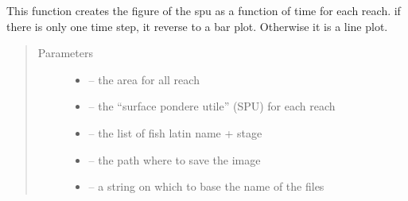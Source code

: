 \documentclass[letterpaper,10pt,english]{sphinxmanual}
\begin{document}
\begin{fulllineitems}
\label{\detokenize{index:src.calcul_hab.save_hab_fig_spu}}
This function creates the figure of the spu as a function of time for each reach. if there is only one
time step, it reverse to a bar plot. Otherwise it is a line plot.
\begin{quote}\begin{description}
\item[{Parameters}] \leavevmode\begin{itemize}
\item {} 
 -- the area for all reach

\item {} 
 -- the ``surface pondere utile'' (SPU) for each reach

\item {} 
 -- the list of fish latin name + stage

\item {} 
 -- the path where to save the image

\item {} 
 -- a string on which to base the name of the files

\end{itemize}

\end{description}\end{quote}

\end{fulllineitems}

\end{document}
